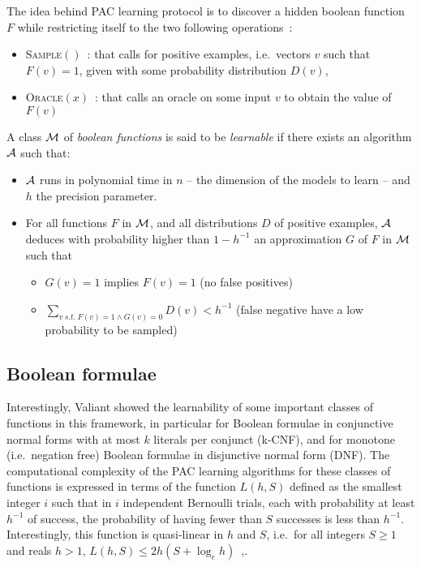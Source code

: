 \documentclass{llncs}
\begin{document}
The idea behind PAC learning protocol is to discover a hidden boolean function $F$ while restricting itself to the two following operations~:
\begin{itemize}
  \item
\textsc{Sample}$()$~: that calls for positive examples, i.e.~vectors $v$ such that $F(v)=1$, given with some probability distribution $D(v)$,
  \item
\textsc{Oracle}$(x)$~: that calls an oracle on some input $v$ to obtain the value of $F(v)$
\end{itemize}


\begin{definition}
   A class $\cal M$ of \emph{boolean functions} is said to be \emph{learnable}
   if there exists an algorithm $\cal A$ such that:
   \begin{itemize}
      \item $\cal A$ runs in polynomial time in $n$ -- the dimension of the models to learn -- and $h$ the precision parameter.
      \item
         For all functions $F$ in $\cal M$, and all distributions $D$ of positive examples,
         $\cal A$ deduces with probability higher than $1-h^{-1}$ an approximation $G$ of $F$ in $\cal M$ such that
         \begin{itemize}
            \item $G(v)=1$ implies $F(v)=1$ (no false positives)
            \item
               $\sum_{v\ s.t.\ F(v)=1\wedge G(v)=0} D(v) < h^{-1}$ (false negative have a low probability to be sampled)
         \end{itemize}
   \end{itemize}
\end{definition}


\subsection{Boolean formulae}

Interestingly, Valiant showed the learnability of some important classes of functions in this framework,
in particular for Boolean formulae in conjunctive normal forms with at most $k$ literals per conjunct (k-CNF),
and for monotone (i.e.~negation free) Boolean formulae in disjunctive normal form (DNF).
The computational complexity of the PAC learning algorithms for these classes of functions is expressed in terms of the function
$L(h,S)$ defined as the smallest integer $i$ such that
in $i$ independent Bernoulli trials, each with probability at least $h^{-1}$ of success, the probability of having fewer than $S$ successes is less than $h^{-1}$.
Interestingly, this function is quasi-linear in $h$ and $S$, i.e.~for all
integers $S\ge 1$ and reals $h>1$, $L(h,S) \le 2h(S+\log_e h)$~\cite{Valiant84cacm},.
\end{document}
